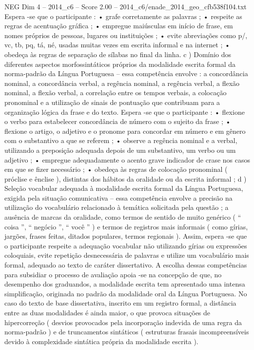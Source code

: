 \begin{textsample}{NEG Dim 4 – 2014\_c6 – Score 2.00 – 2014\_c6/enade\_2014\_geo\_cfb538f104.txt}
Espera -se que o participante : • grafe corretamente as palavras ; • respeite as regras de acentuação gráfica ; • empregue maiúsculas em início de frase, em nomes próprios de pessoas, lugares ou instituições ; • evite abreviações como p/, vc, tb, pq, tá, né, usadas muitas vezes em escrita informal e na internet ; • obedeça às regras de separação de sílabas no final da linha. c ) Domínio dos diferentes aspectos morfossintáticos próprios da modalidade escrita formal da norma-padrão da Língua Portuguesa – essa competência envolve : a concordância nominal, a concordância verbal, a regência nominal, a regência verbal, a flexão nominal, a flexão verbal, a correlação entre os tempos verbais, a colocação pronominal e a utilização de sinais de pontuação que contribuam para a organização lógica da frase e do texto.
Espera -se que o participante : • flexione o verbo para estabelecer concordância de número com o sujeito da frase ; • flexione o artigo, o adjetivo e o pronome para concordar em número e em gênero com o substantivo a que se referem ; • observe a regência nominal e a verbal, utilizando a preposição adequada depois de um substantivo, um verbo ou um adjetivo ; • empregue adequadamente o acento grave indicador de crase nos casos em que se fizer necessário ; • obedeça às regras de colocação pronominal ( próclise e ênclise ), distintas dos hábitos da oralidade ou da escrita informal ; d ) Seleção vocabular adequada à modalidade escrita formal da Língua Portuguesa, exigida pela situação comunicativa – essa competência envolve a precisão na utilização do vocabulário relacionado à temática solicitada pela questão ; a ausência de marcas da oralidade, como termos de sentido de muito genérico ( “ coisa ”, “ negócio ”, “ você ” ) e termos de registros mais informais ( como gírias, jargões, frases feitas, ditados populares, termos regionais ).
Assim, espera -se que o participante respeite a adequação vocabular não utilizando gírias ou expressões coloquiais, evite repetição desnecessária de palavras e utilize um vocabulário mais formal, adequado ao texto de caráter dissertativo.
A escolha dessas competências para subsidiar o processo de avaliação apoia -se na concepção de que, no desempenho dos graduandos, a modalidade escrita tem apresentado uma intensa simplificação, originada no padrão da modalidade oral da Língua Portuguesa.
No caso do texto de base dissertativa, inscrito em um registro formal, a distância entre as duas modalidades é ainda maior, o que provoca situações de hipercorreção ( desvios provocados pela incorporação indevida de uma regra da norma-padrão ) e de truncamentos sintáticos ( estruturas frasais incompreensíveis devido à complexidade sintática própria da modalidade escrita ).

\end{textsample}
